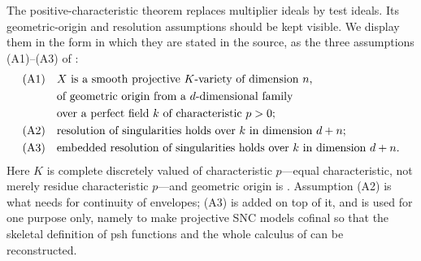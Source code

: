 The positive-characteristic theorem replaces multiplier ideals by test
ideals.  Its geometric-origin and resolution assumptions should be kept
visible.  We display them in the form in which they are stated in the
source, as the three assumptions \textup{(A1)}--\textup{(A3)} of
\cite[\S9]{GJKM19}:
\begin{equation}
\label{eq:ch29-gjkm-assumptions}
\begin{aligned}
 \textup{(A1)}\quad&\text{\(X\) is a smooth projective \(K\)-variety of
   dimension \(n\),}\\
 &\text{of geometric origin from a \(d\)-dimensional family}\\
 &\text{over a perfect field \(k\) of characteristic \(p>0\); }\\
 \textup{(A2)}\quad&\text{resolution of singularities holds over \(k\) in
   dimension \(d+n\);}\\
 \textup{(A3)}\quad&\text{embedded resolution of singularities holds over
   \(k\) in dimension \(d+n\).}
\end{aligned}
\end{equation}
Here \(K\) is complete discretely valued of characteristic \(p\)---equal
characteristic, not merely residue characteristic \(p\)---and geometric
origin is .  Assumption \textup{(A2)} is
what  needs for continuity of
envelopes; \textup{(A3)} is added on top of it, and is used for one purpose
only, namely to make projective SNC models cofinal so that the skeletal
definition of psh functions and the whole calculus of
 can be
reconstructed.

